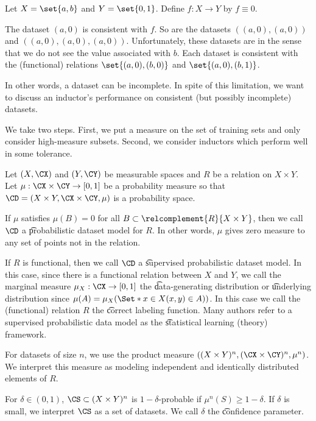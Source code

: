 

Let $X = \set{a, b}$ and $Y = \set{0, 1}$. Define $f: X \to Y$ by $f \equiv 0$.

The dataset $(a, 0)$ is consistent with $f$.
So are the datasets $((a, 0), (a, 0))$ and $((a, 0), (a, 0), (a, 0))$.
Unfortunately, these datasets are  in the sense that we do not see the value associated with $b$.
Each dataset is consistent with the (functional) relations $\set{(a, 0), (b, 0)}$ and $\set{(a, 0), (b, 1)}$.

In other words, a dataset can be incomplete.
In spite of this limitation, we want to discuss an inductor's performance on consistent (but possibly incomplete) datasets.

We take two steps.
First, we put a measure on the set of training sets and only consider high-measure subsets.
Second, we consider inductors which perform well in some tolerance.


Let $(X, \CX)$ and $(Y, \CY)$ be measurable spaces and $R$ be a relation on $X \times Y$.
Let $\mu: \CX \times \CY \to [0, 1]$ be a probability measure so that $\CD = (X \times Y, \CX \times \CY, \mu)$ is a probability space.

If $\mu$ satisfies $\mu(B) = 0$ for all $B \subset \relcomplement{R}{X \times Y}$, then we call $\CD$ a \t{probabilistic dataset model} for $R$.
In other words, $\mu$ gives zero measure to any set of points not in the relation.

If $R$ is functional, then we call $\CD$ a \t{supervised probabilistic dataset model}.
In this case, since there is a functional relation between $X$ and $Y$, we call the marginal measure $\mu_X: \CX \to [0, 1]$ the \t{data-generating distribution} or \t{underlying distribution} since $\mu(A) = \mu_X(\Set*{x \in X}{(x, y) \in A)})$.
In this case we call the (functional) relation $R$ the \t{correct labeling function}.
Many authors refer to a supervised probabilistic data model as the \t{statistical learning (theory) framework}.


For datasets of size $n$, we use the product measure $((X \times Y)^n, (\CX \times \CY)^n, \mu^n)$.
We interpret this measure as modeling independent and identically distributed elements of $R$.

For $\delta \in (0, 1)$, $\CS \subset (X \times Y)^n$ is \t{$1 - \delta$-probable}  if $\mu^n(S) \geq 1 - \delta$. If $\delta$ is small, we interpret $\CS$ as a set of  datasets.
We call $\delta$ the \t{confidence parameter}.